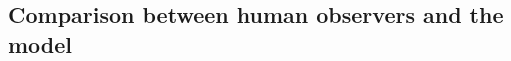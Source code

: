 \documentclass[man]{apa6}
\DeclareMathOperator*{\argmin}{arg\,min}
\begin{document}







\subsection{Comparison between human observers and the model}
\end{document}
